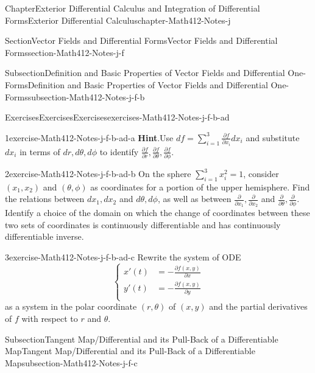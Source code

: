 \documentclass[oneside,10pt,]{book}
\newcommand{\blocktitlefont}{\relax}
\numberwithin{equation}{section}
\newcommand{\amp}{&}
\begin{document}
\begin{chapterptx}{Chapter}{Exterior Differential Calculus and Integration of Differential Forms}{}{Exterior Differential Calculus}{}{}{chapter-Math412-Notes-j}
\begin{sectionptx}{Section}{Vector Fields and Differential Forms}{}{Vector Fields and Differential Forms}{}{}{section-Math412-Notes-j-f}
\begin{subsectionptx}{Subsection}{Definition and Basic Properties of Vector Fields and Differential One-Forms}{}{Definition and Basic Properties of Vector Fields and Differential One-Forms}{}{}{subsection-Math412-Notes-j-f-b}
\begin{exercises-subsubsection-numberless}{Exercises}{Exercises}{}{Exercises}{}{}{exercises-Math412-Notes-j-f-b-ad}
\begin{divisionexercise}{1}{}{}{exercise-Math412-Notes-j-f-b-ad-a}
\noindent\textbf{\blocktitlefont Hint}.\hypertarget{hint-Math412-Notes-j-f-b-ad-a-b}{}\quad{}Use \(df=\sum_{i=1}^{3}\frac{\partial f}{\partial x_{i}}dx_{i}\) and substitute \(dx_{i}\) in terms of \(dr, d\theta, d\phi\) to identify \(\frac{\partial f}{\partial r}, \frac{\partial f}{\partial \theta}, \frac{\partial f}{\partial \phi}\).\end{divisionexercise}%
\begin{divisionexercise}{2}{}{}{exercise-Math412-Notes-j-f-b-ad-b}%
On the sphere \(\sum_{i=1}^{3}x_{i}^{2}=1\), consider \((x_{1}, x_{2})\) and \((\theta, \phi)\) as coordinates for a portion of the upper hemisphere. Find the relations between \(dx_{1}, dx_{2}\) and \(d\theta, d\phi\), as well as between \(\frac{\partial }{\partial x_{1}}, \frac{\partial }{\partial x_{2}}\) and \(\frac{\partial }{\partial \theta}, \frac{\partial }{\partial \phi}\). Identify a choice of the domain on which the change of coordinates between these two sets of coordinates is continuously differentiable and has continuously differentiable inverse.%
\end{divisionexercise}%
\begin{divisionexercise}{3}{}{}{exercise-Math412-Notes-j-f-b-ad-c}%
Rewrite the system of ODE%
\begin{equation*}
\begin{cases} x'(t) \amp =-  \frac{\partial f (x, y)}{\partial x} \\ 
y'(t) \amp = - \frac{\partial f (x, y)}{\partial y} \\
\end{cases}
\end{equation*}
as a system in the polar coordinate \((r, \theta)\) of \((x, y)\) and the partial derivatives of \(f\) with respect to \(r\) and \(\theta\).%
\end{divisionexercise}%
\end{exercises-subsubsection-numberless}
\end{subsectionptx}
%
%
\typeout{************************************************}
\typeout{************************************************}
%
\begin{subsectionptx}{Subsection}{Tangent Map\slash{}Differential and its Pull-Back of a Differentiable Map}{}{Tangent Map\slash{}Differential and its Pull-Back of a Differentiable Map}{}{}{subsection-Math412-Notes-j-f-c}

\end{subsectionptx}
\end{sectionptx}
\end{chapterptx}
\end{document}
